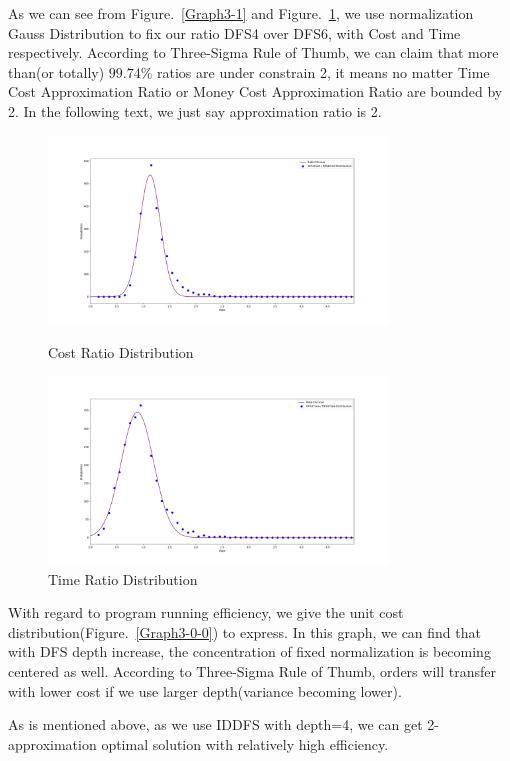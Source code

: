 \documentclass{llncs}
\begin{document}
As we can see from Figure.~\ref{Graph3-1} and Figure.~\ref{Graph3-2}, we use normalization Gauss Distribution to fix our ratio DFS4 over DFS6, with Cost and Time respectively. According to Three-Sigma Rule of Thumb, we can claim that more than(or totally) $99.74\%$ ratios are under constrain 2, it means no matter Time Cost Approximation Ratio or Money Cost Approximation Ratio are bounded by 2. In the following text, we just say approximation ratio is 2.

\begin{figure}[htbp]
\centering
\begin{minipage}[t]{0.48\textwidth}
\centering
\includegraphics[width=9cm]{graph/cost_dfs4dfs6_norm.jpg}
\caption{Cost Ratio Distribution}
\label{Graph3-1}
\end{minipage}
\begin{minipage}[t]{0.48\textwidth}
\centering
\includegraphics[width=9cm]{graph/time_dfs4dfs6_norm.jpg}
\caption{Time Ratio Distribution}
\label{Graph3-2}
\end{minipage}
\end{figure}

With regard to program running efficiency, we give the unit cost distribution(Figure.~\ref{Graph3-0-0}) to express. In this graph, we can find that with DFS depth increase, the concentration of fixed normalization is becoming centered as well. According to Three-Sigma Rule of Thumb, orders will transfer with lower cost if we use larger depth(variance becoming lower).

As is mentioned above, as we use IDDFS with depth=4, we can get 2-approximation optimal solution with relatively high efficiency.
\end{document}
